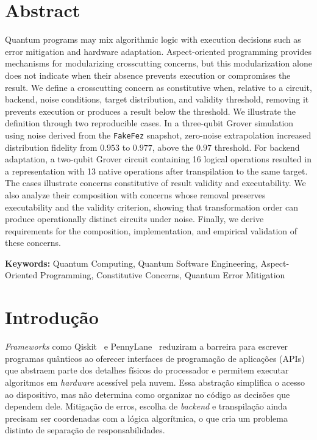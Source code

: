 \documentclass[sigconf]{acmart}
\begin{document}

\frenchspacing
\maketitle

\section*{Abstract}
Quantum programs may mix algorithmic logic with execution decisions such as error mitigation and hardware adaptation. Aspect-oriented programming provides mechanisms for modularizing crosscutting concerns, but this modularization alone does not indicate when their absence prevents execution or compromises the result. We define a crosscutting concern as constitutive when, relative to a circuit, backend, noise conditions, target distribution, and validity threshold, removing it prevents execution or produces a result below the threshold. We illustrate the definition through two reproducible cases. In a three-qubit Grover simulation using noise derived from the \texttt{FakeFez} snapshot, zero-noise extrapolation increased distribution fidelity from $0.953$ to $0.977$, above the $0.97$ threshold. For backend adaptation, a two-qubit Grover circuit containing 16 logical operations resulted in a representation with 13 native operations after transpilation to the same target. The cases illustrate concerns constitutive of result validity and executability. We also analyze their composition with concerns whose removal preserves executability and the validity criterion, showing that transformation order can produce operationally distinct circuits under noise. Finally, we derive requirements for the composition, implementation, and empirical validation of these concerns.

\noindent\textbf{Keywords:} Quantum Computing, Quantum Software Engineering, Aspect-Oriented Programming, Constitutive Concerns, Quantum Error Mitigation

\section{Introdução}

\textit{Frameworks} como Qiskit~\cite{qiskit2023} e PennyLane~\cite{bergholm2022} reduziram a barreira para escrever programas quânticos ao oferecer interfaces de programação de aplicações (APIs) que abstraem parte dos detalhes físicos do processador e permitem executar algoritmos em \textit{hardware} acessível pela nuvem. Essa abstração simplifica o acesso ao dispositivo, mas não determina como organizar no código as decisões que dependem dele. Mitigação de erros, escolha de \textit{backend} e transpilação ainda precisam ser coordenadas com a lógica algorítmica, o que cria um problema distinto de separação de responsabilidades.
\end{document}
